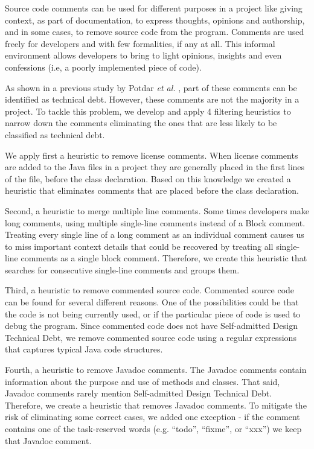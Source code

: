 Source code comments can be used for different purposes in a project like giving context, as part of documentation, to express thoughts, opinions and authorship, and in some cases, to remove source code from the program. Comments are used freely for developers and with few formalities, if any at all. This informal environment allows developers to bring to light opinions, insights and even confessions (i.e, a poorly implemented piece of code). 

As shown in a previous study by Potdar \textit{et al.} \cite{Potdar2014ICSME}, part of these comments can be identified as technical debt. However, these comments are not the majority in a project. To tackle this problem, we develop and apply 4 filtering heuristics to narrow down the comments eliminating the ones that are less likely to be classified as technical debt.

We apply first a heuristic to remove license comments. When license comments are added to the Java files in a project they are generally placed in the first lines of the file, before the class declaration. Based on this knowledge we created a heuristic that eliminates comments that are placed before the class declaration. 

Second, a heuristic to merge multiple line comments. Some times developers make long comments, using multiple single-line comments instead of a Block comment. Treating every single line of a long comment as an individual comment causes us to miss important context details that could be recovered by treating all single-line comments as a single block comment. Therefore, we create this heuristic that searches for consecutive single-line comments and groups them.

Third, a heuristic to remove commented source code. Commented source code can be found for several different reasons. One of the possibilities could be that the code is not being currently used, or if the particular piece of code is used to debug the program. Since commented code does not have Self-admitted Design Technical Debt, we remove commented source code using a regular expressions that captures typical Java code structures.

Fourth, a heuristic to remove Javadoc comments. The Javadoc comments contain information about the purpose and use of methods and classes. That said, Javadoc comments rarely mention Self-admitted Design Technical Debt. Therefore, we create a heuristic that removes Javadoc comments. To mitigate the risk of eliminating some correct cases, we added one exception - if the comment contains one of the task-reserved words (e.g. “todo”, “fixme”, or “xxx”) we keep that Javadoc comment.

